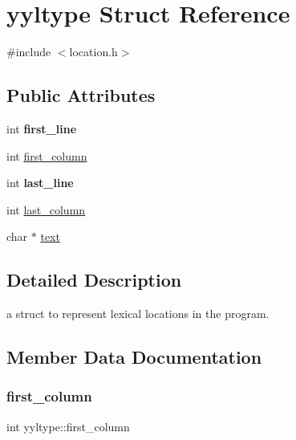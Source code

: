 \hypertarget{structyyltype}{}\section{yyltype Struct Reference}
\label{structyyltype}


{\ttfamily \#include $<$location.\+h$>$}

\subsection*{Public Attributes}
\begin{DoxyCompactItemize}
\item 
\mbox{\label{structyyltype_a883af75af091cd209ef3664fb7d9cf59}} 
int {\bfseries first\+\_\+line}
\item 
int \hyperlink{structyyltype_a7b4b403f29b193e31aa00c9b87f4a2e7}{first\+\_\+column}
\item 
\mbox{\label{structyyltype_a8127c7399f03f0ccab0ab88127b65f7d}} 
int {\bfseries last\+\_\+line}
\item 
int \hyperlink{structyyltype_a3908c6833d48b542a6553f5c804e48f7}{last\+\_\+column}
\item 
char $\ast$ \hyperlink{structyyltype_aad0aa01bb6128302ad61d96adc661336}{text}
\end{DoxyCompactItemize}


\subsection{Detailed Description}
a struct to represent lexical locations in the program. 

\subsection{Member Data Documentation}
\mbox{\label{structyyltype_a7b4b403f29b193e31aa00c9b87f4a2e7}} 
\subsubsection{\texorpdfstring{first\+\_\+column}{first\_column}}
{\footnotesize\ttfamily int yyltype\+::first\+\_\+column}

